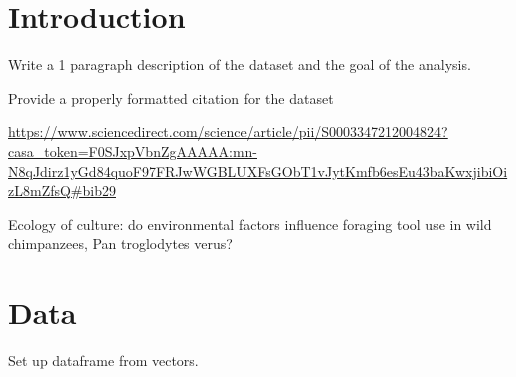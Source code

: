 \documentclass[
]{book}
\begin{document}
\hypertarget{introduction-8}{%
\section{Introduction}\label{introduction-8}}

Write a 1 paragraph description of the dataset and the goal of the analysis.

Provide a properly formatted citation for the dataset

\url{https://www.sciencedirect.com/science/article/pii/S0003347212004824?casa_token=F0SJxpVbnZgAAAAA:mn-N8qJdirz1yGd84quoF97FRJwWGBLUXFsGObT1vJytKmfb6esEu43baKwxjibiOizL8mZfsQ\#bib29}

Ecology of culture: do environmental factors influence foraging tool use in wild chimpanzees, Pan troglodytes verus?

\hypertarget{data-1}{%
\section{Data}\label{data-1}}

Set up dataframe from vectors.
\end{document}
